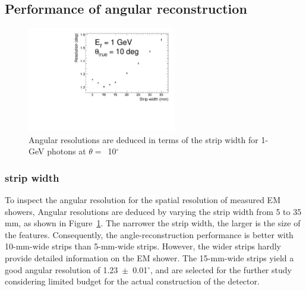 \documentclass[12pt,times,draftclsnofoot,a4paper]{elsarticle}
\begin{document}
\subsection{Performance of angular reconstruction}
\label{sec:perf}

\begin{figure}[!hbt]
\centering
\includegraphics[width=0.58\textwidth]{Fig5_width_including7.5_12.5mm.pdf}
\caption{ Angular resolutions are deduced in terms of the strip width for 1-GeV photons at $\theta=$~10$^{\circ}$ }
\label{fig:angle_reco_width}
\end{figure}
\subsubsection{strip width}
To inspect the angular resolution for the spatial resolution of measured EM showers,  %
Angular resolutions are deduced by varying the strip width from 5 to 35 mm, as shown in Figure~\ref{fig:angle_reco_width}. The narrower the strip width, the larger is the size of the features. Consequently, the angle-reconstruction performance is better with 10-mm-wide strips than 5-mm-wide strips. However, the wider strips hardly provide detailed information on the EM shower. The 15-mm-wide strips yield a good angular resolution of 1.23~$\pm$~0.01$^{\circ}$,
and are selected for the further study considering limited budget for the actual construction of the detector.   %
\end{document}
